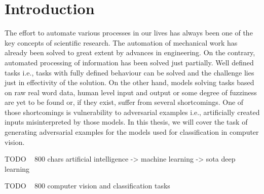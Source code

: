 \chapter*{Introduction}

The effort to automate various processes in our lives has always been one of the key concepts of scientific research. The automation of mechanical work has already been solved to great extent by advances in engineering. On the contrary, automated processing of information has been solved just partially. Well defined tasks i.e., tasks with fully defined behaviour can be solved and the challenge lies just in effectivity of the solution. On the other hand, models solving tasks based on raw real word data, human level input and output or some degree of fuzziness are yet to be found or, if they exist, suffer from several shortcomings. One of those shortcomings is vulnerability to adversarial examples i.e., artificially created inputs misinterpreted by those models. In this thesis, we will cover the task of generating adversarial examples for the models used for classification in computer vision.

TODO ~ 800 chars artificial intelligence -> machine learning -> sota deep learning

TODO ~ 800 computer vision and classification tasks




